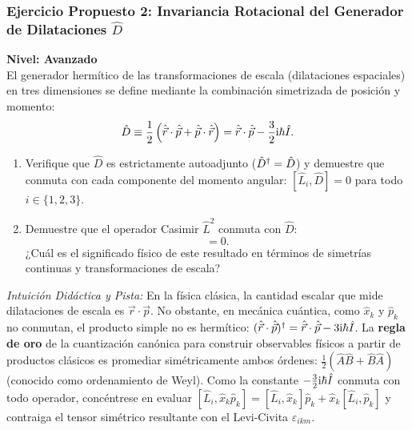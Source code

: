 \subsubsection[Ejercicio 2: Generador de dilataciones $\hat{D}$]{Ejercicio Propuesto 2: Invariancia Rotacional del Generador de Dilataciones $\hat{D}$}
\begin{ejerciciobox}
    \textbf{Nivel: Avanzado}\\
    El generador hermítico de las transformaciones de escala (dilataciones espaciales) en tres dimensiones se define mediante la combinación simetrizada de posición y momento:
    \begin{equation}
        \hat{D} \equiv \frac{1}{2}\left(\hat{\vec{r}}\cdot\hat{\vec{p}} + \hat{\vec{p}}\cdot\hat{\vec{r}}\right) = \hat{\vec{r}}\cdot\hat{\vec{p}} - \frac{3}{2}\mathrm{i}\hbar\hat{I}.
    \end{equation}
    \begin{enumerate}
        \item Verifique que $\hat{D}$ es estrictamente autoadjunto ($\hat{D}^\dagger = \hat{D}$) y demuestre que conmuta con cada componente del momento angular: $[\hat{L}_i, \hat{D}] = 0$ para todo $i \in \{1, 2, 3\}$.
        \item Demuestre que el operador Casimir $\hat{L}^2$ conmuta con $\hat{D}$:
        \begin{equation}
            [\hat{L}^2, \, \hat{D}] = 0.
        \end{equation}
        ¿Cuál es el significado físico de este resultado en términos de simetrías continuas y transformaciones de escala?
    \end{enumerate}
    \textit{Intuición Didáctica y Pista:} En la física clásica, la cantidad escalar que mide dilataciones de escala es $\vec{r}\cdot\vec{p}$. No obstante, en mecánica cuántica, como $\hat{x}_k$ y $\hat{p}_k$ no conmutan, el producto simple no es hermítico: $(\hat{\vec{r}}\cdot\hat{\vec{p}})^\dagger = \hat{\vec{r}}\cdot\hat{\vec{p}} - 3\mathrm{i}\hbar\hat{I}$. La \textbf{regla de oro} de la cuantización canónica para construir observables físicos a partir de productos clásicos es promediar simétricamente ambos órdenes: $\frac{1}{2}(\hat{A}\hat{B} + \hat{B}\hat{A})$ (conocido como ordenamiento de Weyl). Como la constante $-\frac{3}{2}\mathrm{i}\hbar\hat{I}$ conmuta con todo operador, concéntrese en evaluar $[\hat{L}_i, \hat{x}_k\hat{p}_k] = [\hat{L}_i, \hat{x}_k]\hat{p}_k + \hat{x}_k[\hat{L}_i, \hat{p}_k]$ y contraiga el tensor simétrico resultante con el Levi-Civita $\varepsilon_{ikm}$.
\end{ejerciciobox}

